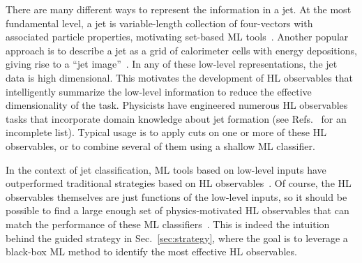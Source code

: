 \documentclass[aps,prd,twocolumn,superscriptaddress,preprintnumbers,nofootinbib,longbibliography,floatfix]{revtex4-1}
\newcommand{\rrefs}[1]{Refs.~\cite{#1}}
\newcommand{\Sec}[1]{Sec.~\ref{#1}}
\begin{document}
There are many different ways to represent the information in a jet. At the most fundamental level, a jet is variable-length collection of four-vectors with associated particle properties, motivating set-based ML tools~\cite{Komiske:2018cqr,Qu:2019gqs,Moreno:2019bmu,Mikuni:2020wpr,Bogatskiy:2020tje,Shlomi:2020ufi}. Another popular approach is to describe a jet as a grid of calorimeter cells with energy depositions, giving rise to a ``jet image''~\cite{Cogan:2014oua,deOliveira:2015xxd}. In any of these low-level representations, the jet data is high dimensional. This motivates the development of HL observables that intelligently summarize the low-level  information to reduce the effective dimensionality of the task. Physicists have engineered numerous HL observables tasks that incorporate domain knowledge about jet formation (see
\rrefs{Butterworth:2008iy,Kaplan:2008ie,Almeida:2008yp,Ellis:2009me,Plehn:2010st,Cui:2010km,Thaler:2010tr,Thaler:2011gf,Ellis:2012sn,Dasgupta:2013ihk,Larkoski:2013eya,Larkoski:2014wba,Aad:2014haa,Larkoski:2014gra,Buckley:2020kdp} for an incomplete list). Typical usage is to apply cuts on one or more of these HL observables, or to combine several of them using a shallow ML classifier.

In the context of jet classification, ML tools based on low-level  inputs have outperformed traditional strategies based on HL observables~\cite{Kasieczka:2019dbj}. Of course, the HL observables themselves are just functions of the low-level  inputs, so it should be possible to find a large enough set of physics-motivated HL observables that can match the performance of these ML classifiers~\cite{Datta:2017rhs,Moore:2018lsr,Aguilar-Saavedra:2020sxp}. This is indeed the intuition behind the guided strategy in \Sec{sec:strategy}, where the goal is to leverage a black-box ML method to identify the most effective HL observables.
\end{document}
